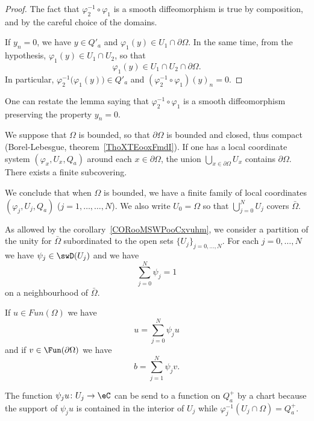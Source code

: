 \begin{proof}
    The fact that \( \varphi_2^{-1}\circ\varphi_1\) is a smooth diffeomorphism is true by composition, and by the careful choice of the domains.

    If \( y_n=0\), we have \( y\in Q'_a\) and \( \varphi_1(y)\in U_1\cap \partial\Omega\). In the same time, from the hypothesis, \( \varphi_1(y)\in U_1\cap U_2\), so that
    \begin{equation}
        \varphi_1(y)\in U_1\cap U_2\cap\partial\Omega.
    \end{equation}
    In particular, \( \varphi_2^{-1}\big( \varphi_1(y) \big)\in Q'_a\) and \( (\varphi_2^{-1}\circ\varphi_1)(y)_n=0\).
\end{proof}
One can restate the lemma saying that \( \varphi_2^{-1}\circ\varphi_1\) is a smooth diffeomorphism preserving the property \( y_n=0\).

\begin{normaltext}
    We suppose that \( \Omega\) is bounded, so that \( \partial\Omega\) is bounded and closed, thus compact (Borel-Lebesgue, theorem~\ref{ThoXTEooxFmdI}). If one has a local coordinate system \( (\varphi_x,U_x,Q_a)\) around each \( x\in \partial\Omega\), the union \( \bigcup_{x\in\partial \Omega}U_x\) contains \( \partial\Omega\). There exists a finite subcovering.

    We conclude that when \( \Omega\) is bounded, we have a finite family of local coordinates \( (\varphi_j,U_j,Q_a)\) (\( j=1,\ldots,\ldots, N\)). We also write \( U_0=\Omega\) so that \( \bigcup_{j=0}^NU_j\) covers \( \bar\Omega\).
\end{normaltext}

As allowed by the corollary~\ref{CORooMSWPooCxvuhm}, we consider a partition of the unity for \( \bar\Omega\) subordinated to the open sets \( \{ U_j \}_{j=0,\ldots, N}\). For each \( j=0,\ldots, N\) we have \( \psi_j\in\swD(U_j)\) and we have
\begin{equation}
    \sum_{j=0}^{N}\psi_j=1
\end{equation}
on a neighbourhood of \( \bar\Omega\).

If \( u\in Fun(\Omega)\) we have
\begin{equation}
    u=\sum_{j=0}^N\psi_ju
\end{equation}
and if \( v\in\Fun(\partial\Omega)\) we have
\begin{equation}
    b=\sum_{j=1}^N\psi_jv.
\end{equation}

The function \( \psi_ju\colon U_j\to \eC\) can be send to a function on \( Q_a^+\) by a chart because the support of \( \psi_ju\) is contained in the interior of \( U_j\) while \( \varphi_j^{-1}(U_j\cap\Omega)=Q_a^+\).

